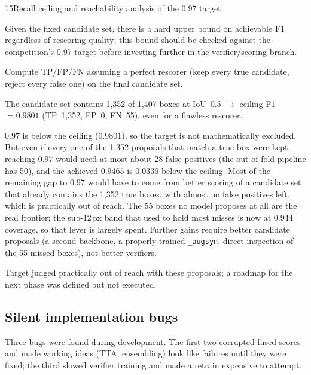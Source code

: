 \begin{explog}{15}{Recall ceiling and reachability analysis of the 0.97 target}
\item[Hypothesis] Given the fixed candidate set, there is a hard upper bound on achievable F1 regardless of rescoring quality; this bound should be checked against the competition's 0.97 target before investing further in the verifier/scoring branch.
\item[Method] Compute TP/FP/FN assuming a perfect rescorer (keep every true candidate, reject every false one) on the final candidate set.
\item[Result] The candidate set contains 1{,}352 of 1{,}407 boxes at IoU~0.5 $\rightarrow$ ceiling F1 $=0.9801$ (TP~1{,}352, FP~0, FN~55), even for a flawless rescorer.
\item[Inference] $0.97$ is below the ceiling ($0.9801$), so the target is not mathematically excluded. But even if every one of the 1{,}352 proposals that match a true box were kept, reaching $0.97$ would need at most about 28 false positives (the out-of-fold pipeline has 50), and the achieved $0.9465$ is $0.0336$ below the ceiling. Most of the remaining gap to $0.97$ would have to come from better scoring of a candidate set that already contains the 1{,}352 true boxes, with almost no false positives left, which is practically out of reach. The 55 boxes no model proposes at all are the real frontier; the sub-12\,px band that used to hold most misses is now at $0.944$ coverage, so that lever is largely spent. Further gains require better candidate proposals (a second backbone, a properly trained \texttt{\_augsyn}, direct inspection of the 55 missed boxes), not better verifiers.
\item[Verdict] Target judged practically out of reach with these proposals; a roadmap for the next phase was defined but not executed.
\end{explog}


\subsection{Silent implementation bugs}
\label{sec:t1-bugs}

Three bugs were found during development. The first two corrupted fused scores and made working ideas (TTA, ensembling) look like failures until they were fixed; the third slowed verifier training and made a retrain expensive to attempt.

